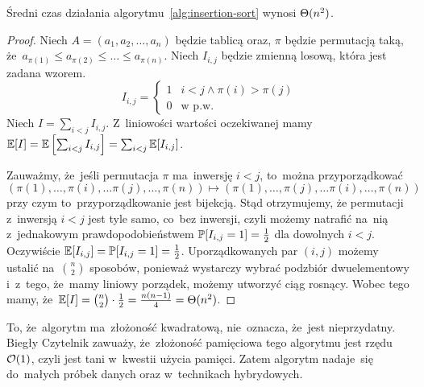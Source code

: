 \begin{fact}
    Średni czas działania algorytmu~\ref{alg:insertion-sort}
    wynosi \( \Theta (n^2) \).
\end{fact}
\begin{proof}
    Niech \( A = (a_1, a_2, \dotsc, a_n) \) będzie
    tablicą oraz, \( \pi \) będzie permutacją
    taką, że~\( a_{\pi(1)} \le a_{\pi(2)} 
    \le \dotsc \le a_{\pi(n)} \).
    Niech \( I_{i,j} \) będzie zmienną losową, która 
    jest zadana wzorem.
    \begin{equation*}
        I_{i,j} = \begin{cases}
            1 & i < j \wedge \pi(i) > \pi(j) \\
            0 & \text{w p.w.}
        \end{cases}
    \end{equation*}
    Niech \( I = \sum_{i < j} I_{i, j} \).
    Z~liniowości wartości oczekiwanej mamy 
    \( \operatorname{\mathbb{E}} [I] = \operatorname{\mathbb{E}} \left[ \sum_{i < j} I_{i, j} \right] 
    = \sum_{i < j} \operatorname{\mathbb{E}} [I_{i, j}] \).

    Zauważmy, że~jeśli permutacja \( \pi \)
    ma~inwersję \( i < j \), to~można przyporządkować 
    \begin{equation*}
        (\pi(1), \dotsc, \pi(i), \dotsc \pi(j), \dotsc, 
        \pi(n)) \mapsto 
        (\pi(1), \dotsc, \pi(j), \dotsc \pi(i), \dotsc, 
        \pi(n))
    \end{equation*}
    przy czym
    to~przyporządkowanie jest bijekcją.
    Stąd otrzymujemy, że permutacji z~inwersją \( i < j \)
    jest tyle samo, co~bez inwersji, czyli możemy
    natrafić na~nią z~jednakowym prawdopodobieństwem
    \( \operatorname{\mathbb{P}} [I_{i, j} = 1] = \frac{1}{2} \) dla dowolnych
    \( i < j \). Oczywiście \( \operatorname{\mathbb{E}} [I_{i, j}] 
    = \operatorname{\mathbb{P}} [I_{i, j} = 1] = \frac{1}{2} \).
    Uporządkowanych par \( (i, j) \) możemy 
    ustalić na~\( \binom{n}{2} \) sposobów,
    ponieważ wystarczy wybrać podzbiór dwuelementowy
    i~z~tego, że~mamy liniowy porządek, możemy
    utworzyć ciąg rosnący.
    Wobec tego mamy, 
    że~\( \operatorname{\mathbb{E}} [I] = \binom{n}{2} \cdot \frac{1}{2} 
    = \frac{n(n - 1)}{4} = \Theta (n^2) \).
\end{proof}

To, że~algorytm ma~złożoność kwadratową, nie~oznacza,
że~jest nieprzydatny. Biegły Czytelnik zawuaży, 
że~złożoność pamięciowa tego algorytmu jest 
rzędu \( \mathcal{O} (1) \), czyli jest tani w~kwestii
użycia pamięci. Zatem algorytm nadaje~się
do~małych próbek danych oraz w~technikach
hybrydowych.